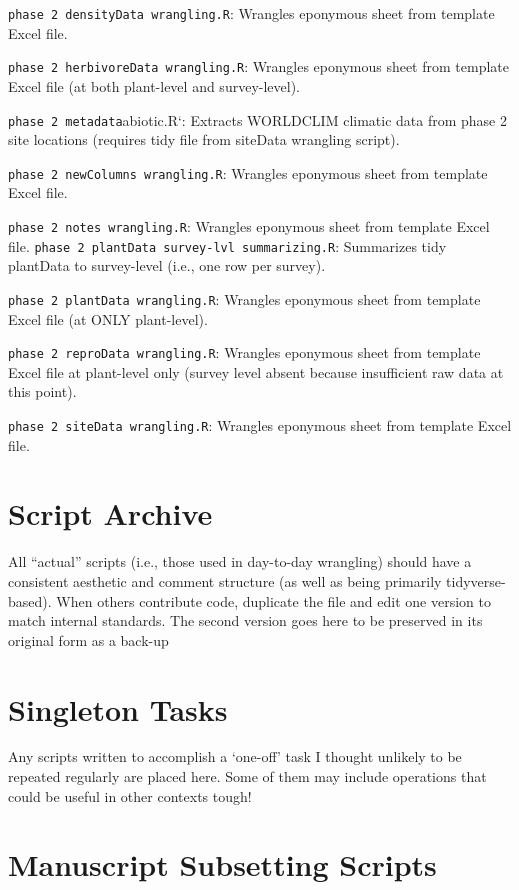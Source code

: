 \documentclass[
  letterpaper,
  DIV=11,
  numbers=noendperiod]{scrreprt}
\begin{document}
\texttt{phase\ 2\ densityData\ wrangling.R}: Wrangles eponymous sheet
from template Excel file.

\texttt{phase\ 2\ herbivoreData\ wrangling.R}: Wrangles eponymous sheet
from template Excel file (at both plant-level and survey-level).

\texttt{phase\ 2\ metadata}abiotic.R`: Extracts WORLDCLIM climatic data
from phase 2 site locations (requires tidy file from siteData wrangling
script).

\texttt{phase\ 2\ newColumns\ wrangling.R}: Wrangles eponymous sheet
from template Excel file.

\texttt{phase\ 2\ notes\ wrangling.R}: Wrangles eponymous sheet from
template Excel file.
\texttt{phase\ 2\ plantData\ survey-lvl\ summarizing.R}: Summarizes tidy
plantData to survey-level (i.e., one row per survey).

\texttt{phase\ 2\ plantData\ wrangling.R}: Wrangles eponymous sheet from
template Excel file (at ONLY plant-level).

\texttt{phase\ 2\ reproData\ wrangling.R}: Wrangles eponymous sheet from
template Excel file at plant-level only (survey level absent because
insufficient raw data at this point).

\texttt{phase\ 2\ siteData\ wrangling.R}: Wrangles eponymous sheet from
template Excel file.

\section{Script Archive}\label{script-archive}

All ``actual'' scripts (i.e., those used in day-to-day wrangling) should
have a consistent aesthetic and comment structure (as well as being
primarily tidyverse-based). When others contribute code, duplicate the
file and edit one version to match internal standards. The second
version goes here to be preserved in its original form as a back-up

\section{Singleton Tasks}\label{singleton-tasks}

Any scripts written to accomplish a `one-off' task I thought unlikely to
be repeated regularly are placed here. Some of them may include
operations that could be useful in other contexts tough!

\section{Manuscript Subsetting
Scripts}\label{manuscript-subsetting-scripts}
\end{document}
